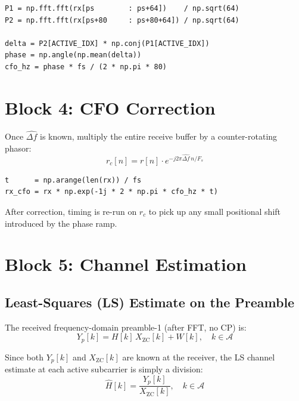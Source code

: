 \documentclass[11pt,a4paper]{article}
\begin{document}
\begin{lstlisting}
P1 = np.fft.fft(rx[ps        : ps+64])    / np.sqrt(64)
P2 = np.fft.fft(rx[ps+80     : ps+80+64]) / np.sqrt(64)

delta = P2[ACTIVE_IDX] * np.conj(P1[ACTIVE_IDX])
phase = np.angle(np.mean(delta))
cfo_hz = phase * fs / (2 * np.pi * 80)
\end{lstlisting}

\section{Block 4: CFO Correction}

Once $\hat{\Delta f}$ is known, multiply the entire receive buffer by a
counter-rotating phasor:
\begin{equation}
  r_c[n] = r[n]\cdot e^{-j2\pi\hat{\Delta f}\,n/F_s}
\end{equation}

\begin{lstlisting}
t      = np.arange(len(rx)) / fs
rx_cfo = rx * np.exp(-1j * 2 * np.pi * cfo_hz * t)
\end{lstlisting}

After correction, timing is re-run on $r_c$ to pick up any small positional
shift introduced by the phase ramp.

\section{Block 5: Channel Estimation}

\subsection{Least-Squares (LS) Estimate on the Preamble}

The received frequency-domain preamble-1 (after FFT, no CP) is:
\begin{equation}
  Y_p[k] = H[k]\,X_{\text{ZC}}[k] + W[k], \quad k \in \mathcal{A}
\end{equation}

Since both $Y_p[k]$ and $X_{\text{ZC}}[k]$ are known at the receiver, the LS
channel estimate at each active subcarrier is simply a division:
\begin{equation}
  \hat{H}[k] = \frac{Y_p[k]}{X_{\text{ZC}}[k]}, \quad k \in \mathcal{A}
\end{equation}
\end{document}
